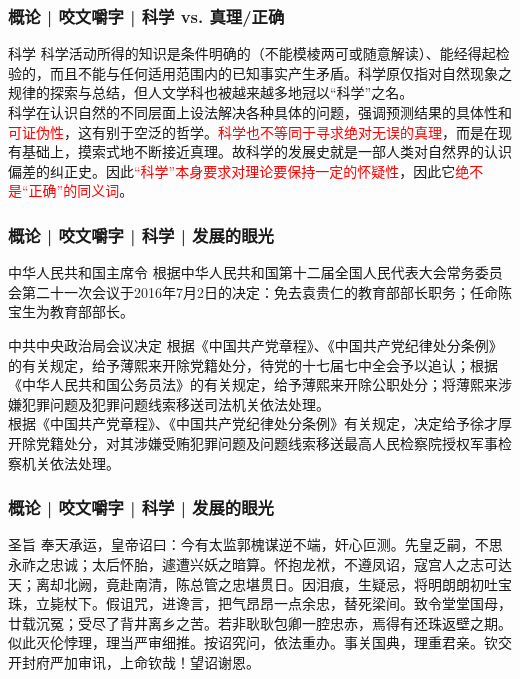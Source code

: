 \begin{frame}
  \frametitle{概论 | 咬文嚼字 | 科学 vs. 真理/正确}
  \begin{block}{科学}
科学活动所得的知识是条件明确的（不能模棱两可或随意解读）、能经得起检验的，而且不能与任何适用范围内的已知事实产生矛盾。科学原仅指对自然现象之规律的探索与总结，但人文学科也被越来越多地冠以“科学”之名。\\
    \vspace{1em}
科学在认识自然的不同层面上设法解决各种具体的问题，强调预测结果的具体性和\textcolor{red}{可证伪性}，这有别于空泛的哲学。\textcolor{red}{科学也不等同于寻求绝对无误的真理}，而是在现有基础上，摸索式地不断接近真理。故科学的发展史就是一部人类对自然界的认识偏差的纠正史。因此\textcolor{red}{“科学”本身要求对理论要保持一定的怀疑性}，因此它\textcolor{red}{绝不是“正确”的同义词}。
  \end{block}
\end{frame}

\begin{frame}
  \frametitle{概论 | 咬文嚼字 | 科学 | 发展的眼光}
  \begin{block}{中华人民共和国主席令}
根据中华人民共和国第十二届全国人民代表大会常务委员会第二十一次会议于2016年7月2日的决定：免去袁贵仁的教育部部长职务；任命陈宝生为教育部部长。
  \end{block}
  \begin{block}{中共中央政治局会议决定}
根据《中国共产党章程》、《中国共产党纪律处分条例》的有关规定，给予薄熙来开除党籍处分，待党的十七届七中全会予以追认；根据《中华人民共和国公务员法》的有关规定，给予薄熙来开除公职处分；将薄熙来涉嫌犯罪问题及犯罪问题线索移送司法机关依法处理。\\
\vspace{0.5em}
根据《中国共产党章程》、《中国共产党纪律处分条例》有关规定，决定给予徐才厚开除党籍处分，对其涉嫌受贿犯罪问题及问题线索移送最高人民检察院授权军事检察机关依法处理。
  \end{block}
\end{frame}

\begin{frame}
  \frametitle{概论 | 咬文嚼字 | 科学 | 发展的眼光}
  \begin{block}{圣旨}
奉天承运，皇帝诏曰：今有太监郭槐谋逆不端，奸心叵测。先皇乏嗣，不思永祚之忠诚；太后怀胎，遽遭兴妖之暗算。怀抱龙袱，不遵凤诏，寇宫人之志可达天；离却北阙，竟赴南清，陈总管之忠堪贯日。因泪痕，生疑忌，将明朗朗初吐宝珠，立毙杖下。假诅咒，进谗言，把气昂昂一点余忠，替死梁间。致令堂堂国母，廿载沉冤；受尽了背井离乡之苦。若非耿耿包卿一腔忠赤，焉得有还珠返壁之期。似此灭伦悖理，理当严审细推。按诏究问，依法重办。事关国典，理重君亲。钦交开封府严加审讯，上命钦哉！望诏谢恩。
  \end{block}
\end{frame}

